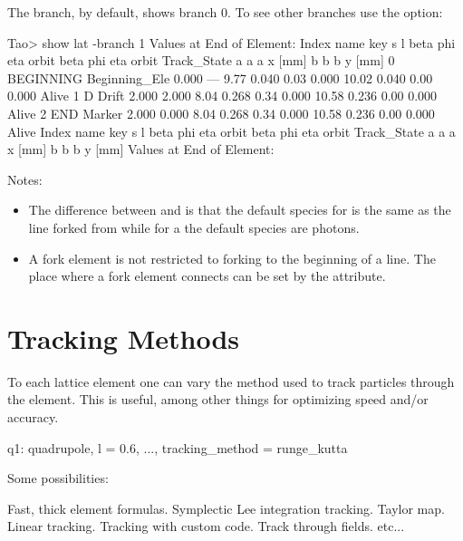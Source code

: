 \documentclass{hitec}
\newcommand{\Section}[1]{\section{#1}\vspace*{-1ex}}
\begin{document}
The  branch, by default, shows branch 0. To see other branches use the  option:
\begin{code}
Tao> show lat -branch 1
      Values at End of Element:
 Index  name      key                       s       l    beta     phi    eta  orbit     beta     phi    eta  orbit    Track_State
                                                            a       a      a  x [mm]       b       b      b  y [mm]
     0  BEGINNING Beginning_Ele         0.000     ---    9.77   0.040   0.03   0.000   10.02   0.040   0.00   0.000   Alive
     1  D         Drift                 2.000   2.000    8.04   0.268   0.34   0.000   10.58   0.236   0.00   0.000   Alive
     2  END       Marker                2.000   0.000    8.04   0.268   0.34   0.000   10.58   0.236   0.00   0.000   Alive
 Index  name      key                       s       l    beta     phi    eta  orbit     beta     phi    eta  orbit    Track_State
                                                            a       a      a  x [mm]       b       b      b  y [mm]
      Values at End of Element:
\end{code}

Notes:
\begin{itemize}
\item The difference between  and  is that the default species for  is
the same as the line forked from while for a  the default species are photons.
\item A fork element is not restricted to forking to the beginning of a line. 
The place where a fork element connects can be set by the  attribute.
\end{itemize}

\Section{Tracking Methods}

To each lattice element one can vary the method used to track particles through the element. This is
useful, among other things for optimizing speed and/or accuracy.
\begin{code}
    q1: quadrupole, l = 0.6, ..., tracking_method = runge_kutta
\end{code}

Some possibilities:
\begin{code}
   Fast, thick element formulas.
    Symplectic Lee integration tracking.
          Taylor map.
          Linear tracking.
          Tracking with custom code.
     Track through fields.
etc...
\end{code}
\end{document}
